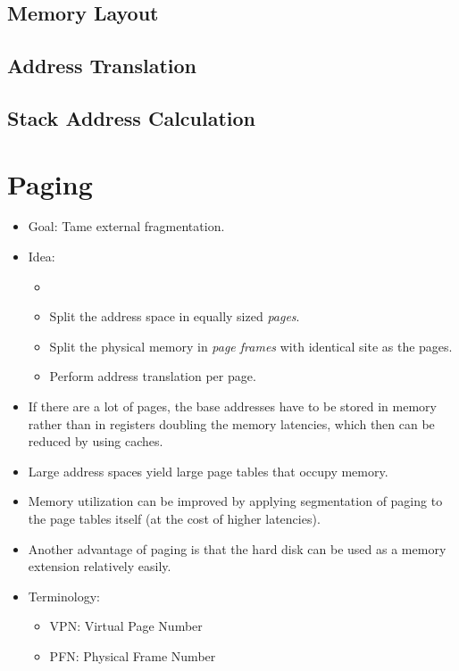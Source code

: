         \subsection{Memory Layout} %

        \subsection{Address Translation} %

        \subsection{Stack Address Calculation} %

    \section{Paging}
        \begin{itemize}
        	\item Goal: Tame external fragmentation.
        	\item Idea:
            	\begin{itemize}
            		\item 
	            	\item Split the address space in equally sized \textit{pages}.
	            	\item Split the physical memory in \textit{page frames} with identical site as the pages.
	            	\item Perform address translation per page.
	            \end{itemize}
        	\item If there are a lot of pages, the base addresses have to be stored in memory rather than in registers doubling the memory latencies, which then can be reduced by using caches.
        	\item Large address spaces yield large page tables that occupy memory.
        	\item Memory utilization can be improved by applying segmentation of paging to the page tables itself (at the cost of higher latencies).
        	\item Another advantage of paging is that the hard disk can be used as a memory extension relatively easily.
        	\item Terminology:
            	\begin{itemize}
            		\item VPN: Virtual Page Number
            		\item PFN: Physical Frame Number
            	\end{itemize}
        \end{itemize}

